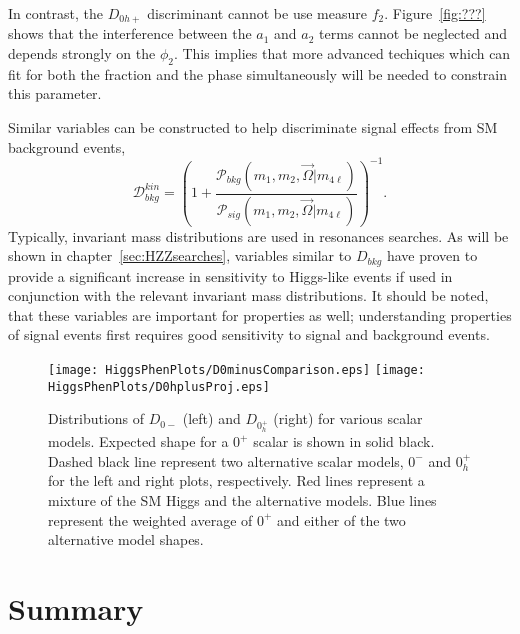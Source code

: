 In contrast, the $D_{0h+}$ discriminant cannot be use measure $f_2$.  
Figure~\ref{fig:???} shows that the interference between the $a_1$
and $a_2$ terms cannot be neglected and depends strongly on the $\phi_2$.
This implies that more advanced techiques which can fit for both the
fraction and the phase simultaneously will be needed to constrain this parameter.

Similar variables can be constructed to help discriminate signal effects 
from SM background events,
\begin{equation}
\mathscr{D}^{kin}_{bkg} = \left(1+\frac{\mathscr{P}_{bkg}(m_1,m_2,\vec{\Omega}|m_{4\ell})}{\mathscr{P}_{sig}(m_1,m_2,\vec{\Omega}|m_{4\ell})}\right)^{-1}.
\label{eq:Dbkg}
\end{equation}
Typically, invariant mass distributions are used in resonances searches. 
As will be shown in chapter~\ref{sec:HZZsearches}, variables similar to 
$D_{bkg}$ have proven to provide a significant increase in sensitivity to 
Higgs-like events if used in conjunction with the relevant invariant
mass distributions.  It should be noted, that these variables are important
for properties as well; understanding properties of signal events first
requires good sensitivity to signal and background events.  

\begin{figure}
\begin{center}
\texttt{[image: HiggsPhenPlots/D0minusComparison.eps]}
\texttt{[image: HiggsPhenPlots/D0hplusProj.eps]}
\caption{Distributions of $D_{0-}$ (left) and $D_{0_h^+}$ (right) for 
various scalar models.  Expected shape for a $0^+$ scalar is
shown in solid black.  Dashed black line represent two alternative
scalar models, $0^-$ and $0^+_h$ for the left and right plots,
respectively.  
Red lines represent a mixture of the SM Higgs and the alternative
models.  Blue lines represent the weighted average
of $0^+$ and either of the two alternative model shapes.}
\label{fig:fa3Comparison}
\end{center}
\end{figure}

\section{Summary}

